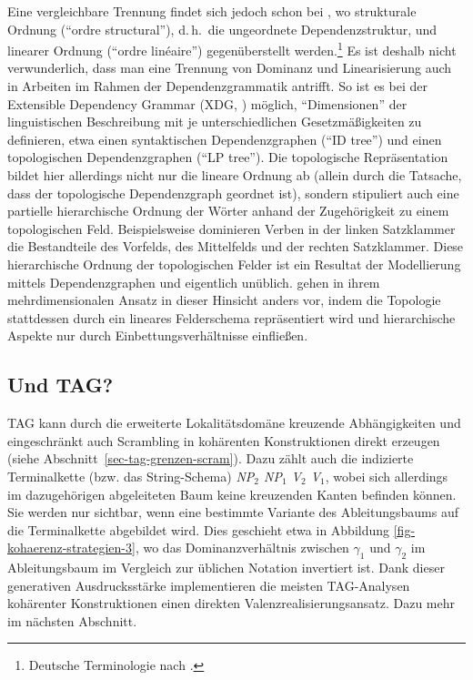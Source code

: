 Eine vergleichbare Trennung findet sich jedoch schon bei \cite{Tesniere:59}, wo strukturale Ordnung ("`ordre structural"'), d.\,h.\ die ungeordnete Dependenzstruktur, und linearer Ordnung ("`ordre lin\'eaire"') gegenüberstellt werden.\footnote{Deutsche Terminologie nach \citet[33]{Agel:00}.} Es ist deshalb nicht verwunderlich, dass man eine Trennung von Dominanz und Linearisierung auch in Arbeiten im Rahmen der Dependenzgrammatik antrifft. So ist es bei der Extensible Dependency Grammar (XDG, \citealt{Duchier:Debusmann:01, Debusmann:etal:04}) möglich, "`Dimensionen"' der linguistischen Beschreibung mit je unterschiedlichen Gesetzmä\ss igkeiten zu definieren, etwa einen syntaktischen Dependenzgraphen ("`ID tree"') und einen topologischen Dependenzgraphen ("`LP tree"'). Die topologische Repräsentation bildet hier allerdings nicht nur die lineare Ordnung ab (allein durch die Tatsache, dass der topologische Dependenzgraph geordnet ist), sondern stipuliert auch eine partielle hierarchische Ordnung der Wörter anhand der Zugehörigkeit zu einem topologischen Feld. Beispielsweise dominieren Verben in der linken Satzklammer die Bestandteile des Vorfelds, des Mittelfelds und der rechten Satzklammer. Diese hierarchische Ordnung der topologischen Felder ist ein Resultat der Modellierung mittels Dependenzgraphen und eigentlich unüblich. \cite{Gerdes:Kahane:01} gehen in ihrem mehrdimensionalen Ansatz in dieser Hinsicht anders vor, indem die Topologie stattdessen durch ein lineares Felderschema repräsentiert wird und hierarchische Aspekte nur durch Einbettungsverhältnisse einflie\ss en. 


\subsection{Und TAG?}

TAG kann durch die erweiterte Lokalitätsdomäne kreuzende Abhängigkeiten und eingeschränkt auch Scrambling in kohärenten Konstruktionen direkt erzeugen (siehe Abschnitt~\ref{sec-tag-grenzen-scram}). Dazu zählt auch die indizierte Terminalkette (bzw. das String-Schema) {\it NP$_2$ NP$_1$ V$_2$ V$_1$}, wobei sich allerdings im dazugehörigen abgeleiteten Baum keine kreuzenden Kanten befinden können. Sie werden nur sichtbar, wenn eine bestimmte Variante des Ableitungsbaums auf die Terminalkette abgebildet wird. Dies geschieht etwa in Abbildung \ref{fig-kohaerenz-strategien-3}, wo das Dominanzverhältnis zwischen $\gamma_1$ und $\gamma_2$ im Ableitungsbaum im Vergleich zur üblichen Notation invertiert ist. Dank dieser generativen Ausdrucksstärke implementieren die meisten TAG-Analysen kohärenter Konstruktionen einen direkten Valenzrealisierungsansatz. Dazu mehr im nächsten Abschnitt.   

